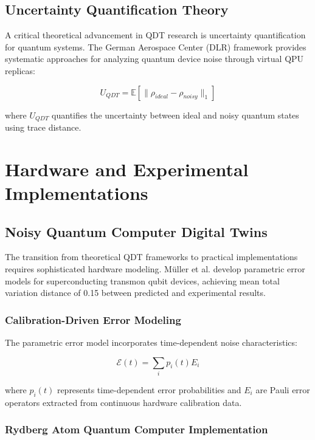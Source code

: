\subsection{Uncertainty Quantification Theory}

A critical theoretical advancement in QDT research is uncertainty quantification for quantum systems. The German Aerospace Center (DLR) framework \cite{dlr2024uncertainty} provides systematic approaches for analyzing quantum device noise through virtual QPU replicas:

\begin{equation}
U_{QDT} = \mathbb{E}[\|\rho_{ideal} - \rho_{noisy}\|_1]
\end{equation}

where $U_{QDT}$ quantifies the uncertainty between ideal and noisy quantum states using trace distance.

\section{Hardware and Experimental Implementations}

\subsection{Noisy Quantum Computer Digital Twins}

The transition from theoretical QDT frameworks to practical implementations requires sophisticated hardware modeling. Müller et al. \cite{muller2024towards} develop parametric error models for superconducting transmon qubit devices, achieving mean total variation distance of 0.15 between predicted and experimental results.

\subsubsection{Calibration-Driven Error Modeling}

The parametric error model incorporates time-dependent noise characteristics:

\begin{equation}
\mathcal{E}(t) = \sum_{i} p_i(t) E_i
\end{equation}

where $p_i(t)$ represents time-dependent error probabilities and $E_i$ are Pauli error operators extracted from continuous hardware calibration data.

\subsubsection{Rydberg Atom Quantum Computer Implementation}

